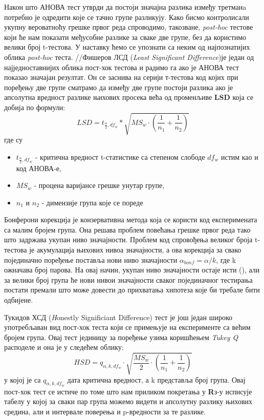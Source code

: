 \documentclass[12pt, a4paper]{article}
\begin{document}
Након што АНОВА тест утврди да постоји значајна разлика између третманa потребно је одредити које 
се тачно групе разликују. Како бисмо контролисали укупну вероватноћу грешке првог реда спроводимо, 
такозване, \textit{post-hoc} тестове који ће нам показати међусобне разлике за сваке две групе, 
без да користимо велики број t-тестова. У наставку ћемо се упознати са неким од најпознатијих 
облика \textit{post-hoc} теста.
//Фишеров ЛСД (\textit{Least Significant Difference})је један од најједноставнијих облика пост-хок 
тестова и радимо га ако је АНОВА тест показао значајан резултат.
Он се заснива на серији т-тестова код којих при поређењу две групе сматрамо да између две групе 
постоји разлика ако је апсолутна вредност разлике њихових просека већа од променљиве \textbf{LSD} 
која се добија по формули:
$$LSD=t_{\frac{\alpha}{2},df_w}*\sqrt{MS_w\cdot(\frac{1}{n_1}+\frac{1}{n_2})}$$ 
где су \begin{itemize} 
    \item $t_{\frac{\alpha}{2},df_w}$ - критична вредност t-статистике са степеном слободе 
    $df_w$ истим као и код АНОВА-е, 
    \item $MS_w$ - процена варијансе грешке унутар групе, 
    \item $n_1$ и $n_2$ - димензије група које се пореде
\end{itemize}

Бонферони корекција је конзервативна метода која се користи код експеримената са малим бројем 
група. Она решава проблем повећања грешке првог реда тако што задржава укупан ниво значајности.
Проблем код спровођења великог броја t-тестова је акумулација њихових нивоа значајности, а ова 
корекција за свако појединачно поређење поставља нови ниво значајности 
$\alpha_{bonf}=\alpha/k$, где k ожначава број парова. На овај начин, укупан ниво значајности 
остаје исти (\alpha), али за велики број група ће нови нивои значајности сваког појединачног 
тестирања постати премали што може довести до прихватања хипотеза које би требале бити одбијене.

Тукидов ХСД (\textit Honestly Significiant Difference) тест је још један широко употребљаван вид 
пост-хок теста који се примењује на експерименте са већим бројем група.
Овај тест јединицу за поређење узима коришћењем \textit{Tukey Q} расподеле и она је у следећем 
облику:
$$HSD=q_{\alpha,k,df_w}\cdot\sqrt{\frac{MS_w}{2}\cdot(\frac{1}{n_1}+\frac{1}{n_2})}$$ 
у којој је са $q_{\alpha,k,df_w}$ дата критична вредност, а k представља број група.
Овај пост-хок тест се истиче по томе што нам приликом покретања у \textbf{R}з-у исписује табелу у 
којој за сваки пар група можемо видети и апсолутну разлику њихових средина, али и интервале 
поверења и p-вредности за те разлике.
\end{document}

